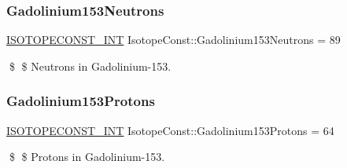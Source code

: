 \subsubsection{\texorpdfstring{Gadolinium153\+Neutrons}{Gadolinium153Neutrons}}
{\footnotesize\ttfamily \mbox{\hyperlink{group___isotope_const-_macros_ga5f18360b3e99483a35c32d789e62621c}{I\+S\+O\+T\+O\+P\+E\+C\+O\+N\+S\+T\+\_\+\+I\+NT}} Isotope\+Const\+::\+Gadolinium153\+Neutrons = 89}

\$ \$ Neutrons in Gadolinium-\/153. \mbox{\label{group___isotope_const-_gadolinium-_gd153_ga464569cf41e60b4475796ae88067d298}} 
\subsubsection{\texorpdfstring{Gadolinium153\+Protons}{Gadolinium153Protons}}
{\footnotesize\ttfamily \mbox{\hyperlink{group___isotope_const-_macros_ga5f18360b3e99483a35c32d789e62621c}{I\+S\+O\+T\+O\+P\+E\+C\+O\+N\+S\+T\+\_\+\+I\+NT}} Isotope\+Const\+::\+Gadolinium153\+Protons = 64}

\$ \$ Protons in Gadolinium-\/153. 